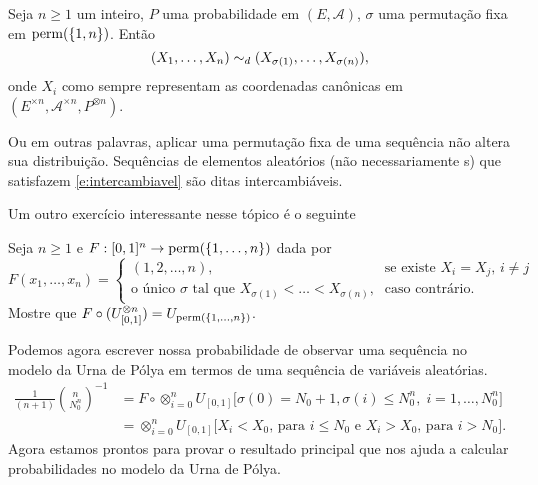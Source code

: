 \begin{topics}
\begin{exercise}
  Seja $n \geq 1$ um inteiro, $P$ uma probabilidade em $(E, \mathcal{A})$, $\sigma$ uma permutação fixa em $\operatorname{perm}(\{1, n\})$.
  Então
  \begin{equation}
    \label{e:intercambiavel}
    (X_1, \dots, X_n) \sim_d (X_{\sigma(1)}, \dots, X_{\sigma(n)}),
  \end{equation}
  onde $X_i$ como sempre representam as coordenadas canônicas em $(E^{\times n}, \mathcal{A}^{\times n}, P^{\otimes n})$.
\end{exercise}

Ou em outras palavras, aplicar uma permutação fixa de uma sequência \iid não altera sua distribuição.
Sequências de elementos aleatórios (não necessariamente \iid s) que satisfazem \eqref{e:intercambiavel} são ditas intercambiáveis. 

Um outro exercício interessante nesse tópico é o seguinte
\begin{exercise}
  Seja $n \geq 1$ e $F:[0,1]^n \to \operatorname{perm}(\{1, \dots, n\})$ dada por
  \begin{equation*}
    F(x_1, \dots, x_n) =
    \begin{cases}
      (1, 2, \dots, n), \quad & \text{se existe $X_i = X_j$, $i \neq j$}\\
      \text{o único $\sigma$ tal que $X_{\sigma(1)} < \dots < X_{\sigma(n)}$,} & \text{caso contrário.}
    \end{cases}
  \end{equation*}
  Mostre que $F \circ (U_{[0,1]}^{\otimes n}) = U_{\operatorname{perm}(\{1, \dots, n\})}$.
\end{exercise}

Podemos agora escrever nossa probabilidade de observar uma sequência no modelo da Urna de Pólya em termos de uma sequência \iid de variáveis aleatórias.
\begin{equation*}
  \begin{split}
    \frac{1}{(n+1)} \binom{n}{N^n_0}^{-1} & = F \circ \otimes_{i=0}^n U_{[0,1]} \Big[ \sigma(0) = N_0 + 1, \sigma(i) \leq N^n_0, \; i = 1, \dots, N^n_0 \Big]\\
    & = \otimes_{i=0}^n U_{[0,1]} \Big[ \text{$X_i < X_0$, para $i \leq N_0$ e $X_i > X_0$, para $i > N_0$} \Big].
  \end{split}
\end{equation*}
Agora estamos prontos para provar o resultado principal que nos ajuda a calcular probabilidades no modelo da Urna de Pólya.


\end{topics}
